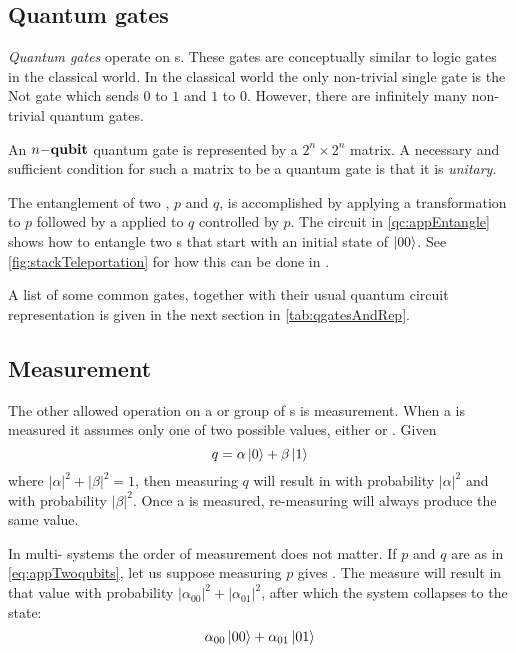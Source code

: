 \subsection{Quantum gates}\label{sec:appQuantumGates}
\emph{Quantum gates} operate on \qubit{}s. These
gates are conceptually similar to logic gates in the classical world.
 In the
classical world the only non-trivial single
\bit{} gate is the Not gate which
sends $0$ to $1$ and $1$ to $0$. However, there are
infinitely many non-trivial quantum
gates.

An $n{-}\mathbf{{qubit}}{}$ quantum gate is represented by
a $2^n \times 2^n$ matrix. A
necessary and sufficient condition for such a matrix to be
a quantum gate is that it is \emph{unitary}.

The entanglement of two \qubits{}, $p$ and $q$, is accomplished by applying a
\Had{} transformation to $p$ followed by
a \nottr{} applied to $q$ controlled by $p$.
The circuit in
\vref{qc:appEntangle} shows how to entangle two \qubit{}s that start with
an initial state of $\left\vert{00}\right\rangle$. See
\vref{fig:stackTeleportation} for how this can be done in \lqpl.

A list of some common gates, together with their usual
quantum circuit representation is given in the next section in
 \vref{tab:qgatesAndRep}.

\subsection{Measurement}\label{sec:appMeasurement}
The  other allowed
operation on a \qubit{} or group of \qubit{}s is
measurement. When a  \qubit{} is measured it
assumes only one of two possible values, either  or . Given
\begin{equation}
q=\alpha\left\vert{0}\right\rangle+\beta\left\vert{1}\right\rangle\label{eq:appSinglequbit}
\end{equation}
where $|\alpha|^2+|\beta|^2 = 1$, then measuring $q$ will result in
 with probability $|\alpha|^2$ and  with
probability $|\beta|^2$.
Once a \qubit{} is measured, re-measuring will always produce the same
value.

In multi-\qubit{} systems the order of measurement does not matter.
If $p$ and $q$ are as in \vref{eq:appTwoqubits}, let us suppose measuring $p$
gives  . The measure will result in  that value with probability
$|\alpha_{00}|^2 + |\alpha_{01}|^2$, after which the system
collapses to the state:
\begin{equation}
\alpha_{00}\left\vert{00}\right\rangle + \alpha_{01}\left\vert{01}\right\rangle\label{eq:appCollapsedFirstBit}
\end{equation}

